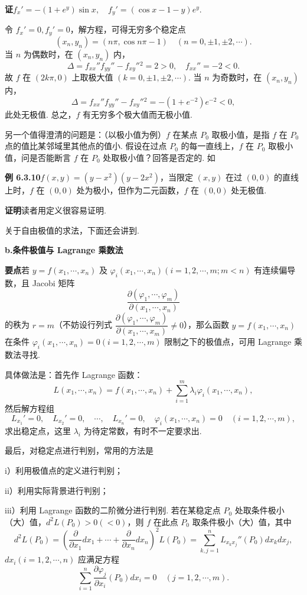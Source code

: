 \documentclass[UTF8, 12pt, fontset=fandol, oneside]{ctexart}
\begin{document}
\noindent\textbf{证}\quad $f_x'=-(1+e^y)\sin x,\quad f_y'=(\cos x-1-y)e^y$.

令 $f_x'=0,f_y'=0$，解方程，可得无穷多个稳定点
\[
  (x_n,y_n)=(n\pi,\cos n\pi-1)\quad(n=0,\pm1,\pm2,\cdots).
\]
当 $n$ 为偶数时，在 $(x_n,y_n)$ 内，
\[
  \Delta=f_{xx}''f_{yy}''-f_{xy}''{}^2=2>0,\quad f_{xx}''=-2<0.
\]
故 $f$ 在 $(2k\pi,0)$ 上取极大值 $(k=0,\pm1,\pm2,\cdots)$. 当 $n$ 为奇数时，在 $(x_n,y_n)$ 内，
\[
  \Delta=f_{xx}''f_{yy}''-f_{xy}''{}^2=-(1+e^{-2})e^{-2}<0,
\]
此处无极值. 总之，$f$ 有无穷多个极大值而无极小值.

另一个值得澄清的问题是：（以极小值为例）$f$ 在某点 $P_0$ 取极小值，是指 $f$ 在 $P_0$ 点的值比某邻域里其他点的值小. 假设在过点 $P_0$ 的每一直线上，$f$ 在 $P_0$ 取极小值，问是否能断言 $f$ 在 $P_0$ 处取极小值？回答是否定的. 如

\noindent\textbf{例 6.3.10}\quad $f(x,y)=(y-x^2)(y-2x^2)$，当限定 $(x,y)$ 在过 $(0,0)$ 的直线上时，$f$ 在 $(0,0)$ 处为极小，但作为二元函数，$f$ 在 $(0,0)$ 处无极值.

\noindent\textbf{证明}\quad 读者用定义很容易证明.

关于自由极值的求法，下面还会讲到.

\noindent\textbf{b.\quad 条件极值与 Lagrange 乘数法}

\noindent\textbf{要点}\quad 若 $y=f(x_1,\cdots,x_n)$ 及 $\varphi_i(x_1,\cdots,x_n)(i=1,2,\cdots,m;m<n)$ 有连续偏导数，且 Jacobi 矩阵
\[
  \frac{\partial(\varphi_1,\cdots,\varphi_m)}{\partial(x_1,\cdots,x_n)}
\]
的秩为 $r=m$（不妨设行列式 $\dfrac{\partial(\varphi_1,\cdots,\varphi_m)}{\partial(x_1,\cdots,x_m)}\ne0$），那么函数 $y=f(x_1,\cdots,x_n)$ 在条件 $\varphi_i(x_1,\cdots,x_n)=0(i=1,2,\cdots,m)$ 限制之下的极值点，可用 Lagrange 乘数法寻找.

具体做法是：首先作 Lagrange 函数：
\[
  L(x_1,\cdots,x_n)=f(x_1,\cdots,x_n)+\sum_{i=1}^{m}\lambda_i\varphi_i(x_1,\cdots,x_n),
\]
然后解方程组
\[
  L_{x_1}'=0,\quad L_{x_2}'=0,\quad\cdots,\quad L_{x_n}'=0,\quad
  \varphi_i(x_1,\cdots,x_n)=0\quad(i=1,2,\cdots,m),
\]
求出稳定点，这里 $\lambda_i$ 为待定常数，有时不一定要求出.

最后，对稳定点进行判别，常用的方法是

i）利用极值点的定义进行判别；

ii）利用实际背景进行判别；

iii）利用 Lagrange 函数的二阶微分进行判别. 若在某稳定点 $P_0$ 处取条件极小（大）值，$d^2L(P_0)>0(<0)$，则 $f$ 在此点 $P_0$ 取条件极小（大）值，其中
\[
  d^2L(P_0)=
  \left(\frac{\partial}{\partial x_1}dx_1+\cdots+
  \frac{\partial}{\partial x_n}dx_n\right)^2L(P_0)
  =\sum_{k,j=1}^{n}L_{x_kx_j}''(P_0)dx_kdx_j,
\]
$dx_i(i=1,2,\cdots,n)$ 应满足方程
\[
  \sum_{i=1}^{n}\frac{\partial\varphi_j}{\partial x_i}(P_0)dx_i=0
  \quad(j=1,2,\cdots,m).
\]
\end{document}
